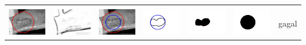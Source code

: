 \begin{table}[H]
\begin{tabular}{|m{0.7in}|m{0.7in}|m{0.7in}|m{0.7in}|m{0.7in}|m{0.7in}|m{0.7in}|}
		&  &  & & & &  \\
		\includegraphics[width=0.7in]{dataset/dataset_3/luka_kuning/ready/3_integer_init.jpg}&
		\includegraphics[width=0.7in]{dataset/dataset_3/luka_kuning/ready/3_integer_ext.jpg}&
		\includegraphics[width=0.7in]{dataset/dataset_3/luka_kuning/ready/3_integer_result.jpg}&
		\includegraphics[width=0.7in]{dataset/dataset_3/luka_kuning/ready/3_gt_r_integer.jpg}&
		\includegraphics[width=0.7in]{dataset/dataset_3/luka_kuning/ready/3_r.jpg}&
		\includegraphics[width=0.7in]{dataset/dataset_3/luka_kuning/ready/3_integer_r.jpg}&
		gagal\\
		\hline
		

\end{tabular}
\end{table}

